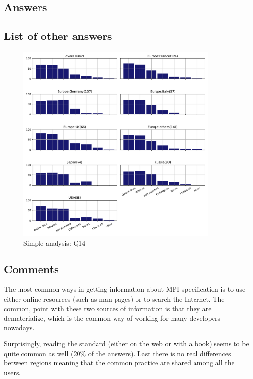 
\subsection{Answers}


\subsection{List of other answers}
\begin{itemize}

\end{itemize}

\begin{figure}[htb]
\begin{center}
\includegraphics[width=10cm]{../pdfs/Q14.pdf}
\caption{Simple analysis: Q14}
\label{fig:Q14}
\end{center}
\end{figure}

\subsection{Comments}
The most common ways in getting information about MPI specification is to use
either online resources (such as man pages) or to search the Internet. The
common, point with these two sources of information is that they are
dematerialize, which is the common way of working for many developers nowadays.   

Surprisingly, reading the standard (either on the web or with a book) seems to
be quite common as well (20\% of the answers). Last there is no real differences
between regions meaning that the common practice are shared among all the
users. 

